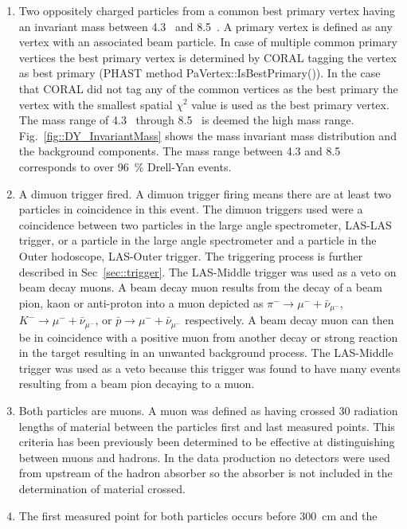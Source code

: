 \begin{enumerate}
\item Two oppositely charged particles from a common best primary vertex having
  an invariant mass between 4.3~{\gvcw} and 8.5~{\gvcw}.  A primary vertex is
  defined as any vertex with an associated beam particle.  In case of multiple
  common primary vertices the best primary vertex is determined by CORAL tagging
  the vertex as best primary (PHAST method PaVertex::IsBestPrimary()).  In the
  case that CORAL did not tag any of the common vertices as the best primary the
  vertex with the smallest spatial $\chi^2$ value is used as the best primary
  vertex.  The mass range of 4.3~{\gvcw} through 8.5~{\gvcw} is deemed the high
  mass range.  Fig.~\ref{fig::DY_InvariantMass} shows the mass invariant mass
  distribution and the background components.  The mass range between 4.3 and
  8.5~{\gvcw} corresponds to over 96~\% Drell-Yan events.
\item A dimuon trigger fired.  A dimuon trigger firing means there are at least
  two particles in coincidence in this event. The dimuon triggers used were a
  coincidence between two particles in the large angle spectrometer, LAS-LAS
  trigger, or a particle in the large angle spectrometer and a particle in the
  Outer hodoscope, LAS-Outer trigger.  The triggering process is further
  described in Sec~\ref{sec::trigger}.  The LAS-Middle trigger was used as a
  veto on beam decay muons.  A beam decay muon results from the decay of a beam
  pion, kaon or anti-proton into a muon depicted as $\pi^- \rightarrow \mu^- +
  \bar{\nu}_{\mu^-}$, $K^- \rightarrow \mu^- + \bar{\nu}_{\mu^-}$, or $\bar{p}
  \rightarrow \mu^- + \bar{\nu}_{\mu^-}$ respectively.  A beam decay muon can
  then be in coincidence with a positive muon from another decay or strong
  reaction in the target resulting in an unwanted background process.  The
  LAS-Middle trigger was used as a veto because this trigger was found to have
  many events resulting from a beam pion decaying to a muon.
\item Both particles are muons.  A muon was defined as having crossed 30
  radiation lengths of material between the particles first and last measured
  points.  This criteria has been previously been determined to be effective at
  distinguishing between muons and hadrons.  In the data production no
  detectors were used from upstream of the hadron absorber so the absorber is
  not included in the determination of material crossed.
\item The first measured point for both particles occurs before 300~cm and the

\end{enumerate}
